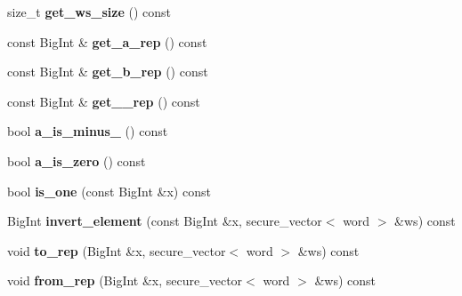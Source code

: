 \begin{DoxyCompactItemize}
size\+\_\+t {\bfseries get\+\_\+ws\+\_\+size} () const
\item 
\mbox{\label{class_botan_1_1_curve_g_fp_a72b9901ea8bb28a45d4099c5df17dac5}} 
const Big\+Int \& {\bfseries get\+\_\+a\+\_\+rep} () const
\item 
\mbox{\label{class_botan_1_1_curve_g_fp_a916ab22308875884e0ee59fadee43fb4}} 
const Big\+Int \& {\bfseries get\+\_\+b\+\_\+rep} () const
\item 
\mbox{\label{class_botan_1_1_curve_g_fp_a4076862f0c6024c2652929b26049ce10}} 
const Big\+Int \& {\bfseries get\+\_\+\_\+rep} () const
\item 
\mbox{\label{class_botan_1_1_curve_g_fp_a1680fefc41c4b1638cfeb1bc6735c6fe}} 
bool {\bfseries a\+\_\+is\+\_\+minus\+\_} () const
\item 
\mbox{\label{class_botan_1_1_curve_g_fp_a5ef49004461eecb5130f9faabdd6f47e}} 
bool {\bfseries a\+\_\+is\+\_\+zero} () const
\item 
\mbox{\label{class_botan_1_1_curve_g_fp_a414ef8f77843cec78aca0c2dadcee305}} 
bool {\bfseries is\+\_\+one} (const Big\+Int \&x) const
\item 
\mbox{\label{class_botan_1_1_curve_g_fp_a2a756517a4bf28bd7db7216d13bffd80}} 
Big\+Int {\bfseries invert\+\_\+element} (const Big\+Int \&x, secure\+\_\+vector$<$ word $>$ \&ws) const
\item 
\mbox{\label{class_botan_1_1_curve_g_fp_aa6ad54213e6741e2ed9408f0794b6ac1}} 
void {\bfseries to\+\_\+rep} (Big\+Int \&x, secure\+\_\+vector$<$ word $>$ \&ws) const
\item 
\mbox{\label{class_botan_1_1_curve_g_fp_af0fc7c4e141087407348e88d8efe41cd}} 
void {\bfseries from\+\_\+rep} (Big\+Int \&x, secure\+\_\+vector$<$ word $>$ \&ws) const
\item 
\mbox{\label{class_botan_1_1_curve_g_fp_a506ad44c75e73c604aa6c5bfc21ebc32}} 

\end{DoxyCompactItemize}
